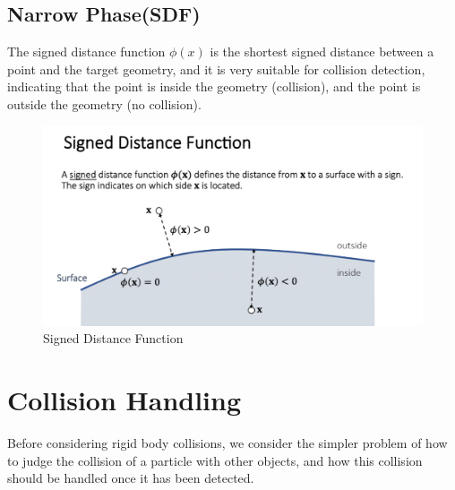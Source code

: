 \documentclass[acmtog]{acmart}
\begin{document}
\subsection{Narrow Phase(SDF)}
The signed distance function $\phi(x)$ is the shortest signed distance between a point and the target geometry, and it is very suitable for collision detection, indicating that the point is inside the geometry (collision), and the point is outside the geometry (no collision).
\begin{figure}[htb]
	\includegraphics[width=\linewidth]{Signed Distance Function.png}
	\caption{Signed Distance Function}
\end{figure}
\section{Collision Handling}
Before considering rigid body collisions, we consider the simpler problem of how to judge the collision of a particle with other objects, and how this collision should be handled once it has been detected.
\end{document}

